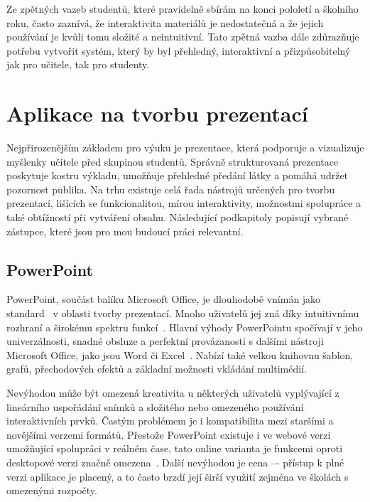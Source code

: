 Ze zpětných vazeb studentů, které pravidelně sbírám na konci pololetí a školního roku, často zaznívá, že interaktivita materiálů je nedostatečná a že jejich používání je kvůli tomu složité a neintuitivní.
Tato zpětná vazba dále zdůrazňuje potřebu vytvořit systém, který by byl přehledný, interaktivní a přizpůsobitelný jak pro učitele, tak pro studenty.



\section{Aplikace na tvorbu prezentací}\label{text:analyza/prezentace}

Nejpřirozenějším základem pro výuku je prezentace, která podporuje a vizualizuje myšlenky učitele před skupinou studentů.
Správně strukturovaná prezentace poskytuje kostru výkladu, umožňuje přehledné předání látky a pomáhá udržet pozornost publika.
Na trhu existuje celá řada nástrojů určených pro tvorbu prezentací, lišících se funkcionalitou, mírou interaktivity, možnostmi spolupráce a také obtížností při vytváření obsahu.
Následující podkapitoly popisují vybrané zástupce, které jsou pro mou budoucí práci relevantní.

\subsection{PowerPoint}

PowerPoint, součást balíku Microsoft Office, je dlouhodobě vnímán jako standard~\cite{pp_usage} v oblasti tvorby prezentací.
Mnoho uživatelů jej zná díky intuitivnímu rozhraní a širokému spektru funkcí~\cite{pp_usage}.
Hlavní výhody PowerPointu spočívají v jeho univerzálnosti, snadné obsluze a perfektní provázanosti s dalšími nástroji Microsoft Office, jako jsou Word či Excel~\cite{pp_excel, pp_word}.
Nabízí také velkou knihovnu šablon, grafů, přechodových efektů a základní možnosti vkládání multimédií.

Nevýhodou může být omezená kreativita u některých uživatelů vyplývající z lineárního uspořádání snímků a složitého nebo omezeného používání interaktivních prvků. 
Častým problémem je i kompatibilita mezi staršími a novějšími verzemi formátů.
Přestože PowerPoint existuje i ve webové verzi umožňující spolupráci v reálném čase, tato online varianta je funkcemi oproti desktopové verzi značně omezena~\cite{pp_platforms}.
Další nevýhodou je cena –- přístup k plné verzi aplikace je placený, a to často brzdí její širší využití zejména ve školách s omezenými rozpočty.

